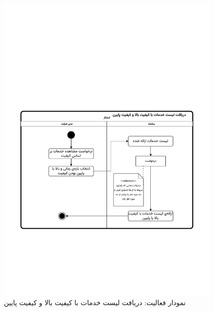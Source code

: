 \begin{figure}[ht!]
	\centering
	\includegraphics[scale=0.8, page=1]{figs/OOD-activity-quality.pdf}
	\caption{نمودار فعالیت: دریافت لیست خدمات با کیفیت بالا و کیفیت پایین}
\end{figure}
\FloatBarrier
\newpage

